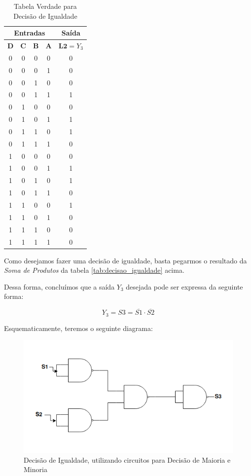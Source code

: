 \documentclass[12pt]{article}
\begin{document}
\begin{table}[H]
    \centering
    \caption{Tabela Verdade para Decisão de Igualdade}
    \begin{tabular}{|c|c|c|c|c|}\hline
    \multicolumn{4}{|c|}{Entradas} & \multicolumn{1}{|c|}{Saída} \\\hline
    \textbf{D} & \textbf{C} & \textbf{B} & \textbf{A} & $\textbf{L2}=Y_{3}$ \\\hline
    0 & 0 & 0 & 0 & 0 \\\hline
    0 & 0 & 0 & 1 & 0 \\\hline
    0 & 0 & 1 & 0 & 0 \\\hline
    0 & 0 & 1 & 1 & 1 \\\hline
    0 & 1 & 0 & 0 & 0 \\\hline
    0 & 1 & 0 & 1 & 1 \\\hline
    0 & 1 & 1 & 0 & 1 \\\hline
    0 & 1 & 1 & 1 & 0 \\\hline
    1 & 0 & 0 & 0 & 0 \\\hline
    1 & 0 & 0 & 1 & 1 \\\hline
    1 & 0 & 1 & 0 & 1 \\\hline
    1 & 0 & 1 & 1 & 0 \\\hline
    1 & 1 & 0 & 0 & 1 \\\hline
    1 & 1 & 0 & 1 & 0 \\\hline
    1 & 1 & 1 & 0 & 0 \\\hline
    1 & 1 & 1 & 1 & 0 \\\hline
    \end{tabular}\label{tab:tabela_verdade_decisao_igualdade}
\end{table}

Como desejamos fazer uma decisão de igualdade, basta pegarmos o resultado da
\textit{Soma de Produtos} da tabela \ref{tab:decisao_igualdade} acima.

Dessa forma, concluímos que a saída \(Y_{3}\) desejada pode ser expressa da
seguinte forma:

\begin{equation}
  Y_{3} = S3 = \overline{S1} \cdot \overline{S2} \label{eq:2.3_NAND}
\end{equation}

Esquematicamente, teremos o seguinte diagrama:

\begin{figure}[H]
    \centering
    \includegraphics[width=.6\textwidth]{Exp03/2.3.png}
    \caption{Decisão de Igualdade, utilizando circuitos para Decisão de Maioria e Minoria}
    \label{fig:decisao_igualdade}
\end{figure}
\end{document}
